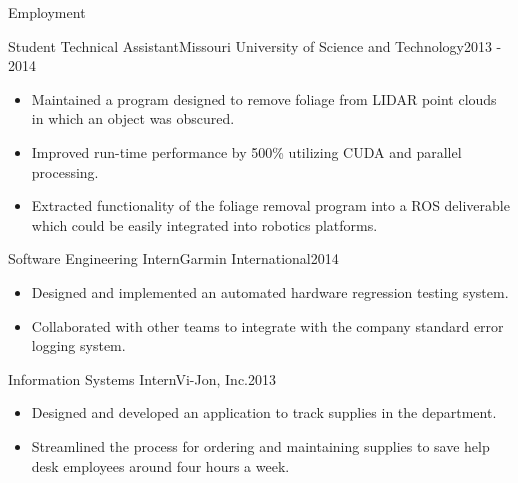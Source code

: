\documentclass[]{mcdowellcv}
\begin{document}
\begin{cvsection}{Employment}
\begin{rockmech}
    \begin{cvsubsection}[2]{Student Technical Assistant}{Missouri University of Science and Technology}{2013 - 2014}        
        \begin{itemize}
            \item Maintained a program designed to remove foliage from LIDAR point clouds in which an object was obscured.
            \item Improved run-time performance by 500\% utilizing CUDA and parallel processing.
            \item Extracted functionality of the foliage removal program into a ROS deliverable which could be easily integrated into robotics platforms.
        \end{itemize}
    \end{cvsubsection}
\end{rockmech}
    
\begin{garmin}
    \begin{cvsubsection}{Software Engineering Intern}{Garmin International}{2014}   
        \begin{itemize}
            \item Designed and implemented an automated hardware regression testing system.
            \item Collaborated with other teams to integrate with the company standard error logging system.
        \end{itemize}
    \end{cvsubsection}
\end{garmin}

\begin{vijon}
    \begin{cvsubsection}{Information Systems Intern}{Vi-Jon, Inc.}{2013}
        \begin{itemize}
            \item Designed and developed an application to track supplies in the department.
            \item Streamlined the process for ordering and maintaining supplies to save help desk employees around four hours a week.
        \end{itemize}
    \end{cvsubsection}
\end{vijon}

\end{cvsection}
\end{document}
